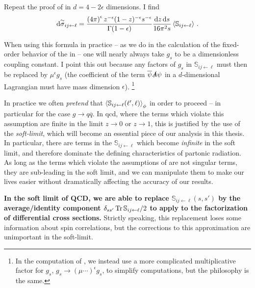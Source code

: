 \begin{exercise}
    \label{ex:d-dimensional-splitting}
    Repeat the proof of  in \(d = 4 - 2\epsilon\) dimensions.
    I find
    \begin{align}
        \dd \overset{\sim}{\sigma}_{ij\leftarrow \ell}
        =
        \frac{\left(4\pi\right)^\epsilon z^{-\epsilon}(1-z)^{-\epsilon} s^{-\epsilon}}{\Gamma(1-\epsilon)}
        \frac{\dd z \, \dd s}{16 \pi^2 s}
        \left\langle\mathbb{S}_{ij\leftarrow \ell}\right\rangle
        \,.
    \end{align}

    When using this formula in practice -- as we do in the calculation of the fixed-order behavior of the  in  -- one will nearly always take \(g_s\) to be a dimensionless coupling constant.
    I point this out because any factors of \(g_s\) in \(\mathbb{S}_{ij \leftarrow \ell}\) must then be replaced by \(\mu^\epsilon g_s\) (the coefficient of the term \(\overline{\psi} \slashed{A} \psi\) in a \(d\)-dimensional Lagrangian must have mass dimension \(\epsilon\)).%
    \footnote{
        In the computation of , we instead use a more complicated multiplicative factor for \(g_s\), \(g_s \to (\mu \cdots)^\epsilon g_s\), to simplify computations, but the philosophy is the same.
    }
\end{exercise}




In practice we often \textit{pretend} that \(
        \left\langle\mathbb{S}_{ij \leftarrow \ell}(\ell', \ell)\right\rangle_\phi
\) in order to proceed -- in particular for the case \(g \to q \overline{q}\).
%
In \gls{qcd}, where the terms which violate this assumption are finite in the limit \(z \to 0\) or \(z \to 1\), this is justified by the use of the \textit{\gls{soft-limit}}, which will become an essential piece of our analysis in this thesis.
%
In particular, there are terms in the \(\mathbb{S}_{ij \leftarrow \ell}\) which become \textit{infinite} in the soft limit, and therefore dominate the defining characteristics of partonic radiation.
%
As long as the terms which violate the assumptions of  are not singular terms, they are sub-leading in the soft limit, and we can manipulate them to make our lives easier without dramatically affecting the accuracy of our results.


\textbf{In the soft limit of QCD, we are able to replace \(\mathbb{S}_{ij \leftarrow \ell}(s, s')\) by the average/identity component \(\delta_{s s'} \Tr \mathbb{S}_{ij \leftarrow \ell}/2\) to apply  to the factorization of differential cross sections.}
%
Strictly speaking, this replacement loses some information about spin correlations, but the corrections to this approximation are unimportant in the \gls{soft-limit}.


